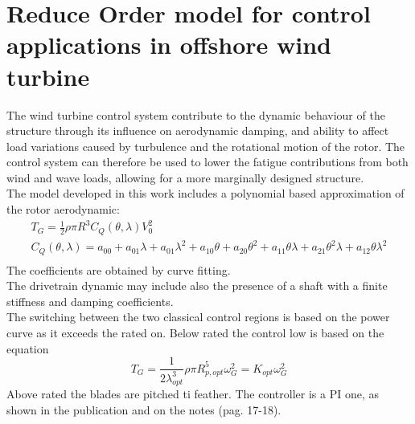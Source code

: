 \documentclass[]{article}
\begin{document}
\newpage
\section{Reduce Order model for control applications in offshore wind turbine  \cite{SMILDEN2016386}}
The wind turbine control system contribute to the dynamic behaviour of the structure through its influence on aerodynamic damping, and ability to affect load variations caused by turbulence and the rotational motion of the rotor. The control system can therefore be used to lower the fatigue contributions from both wind and wave loads, allowing for a more marginally designed structure. \\ 
The model developed in this work includes a polynomial based approximation of the rotor aerodynamic:
\begin{gather}
	T_G = \frac{1}{2}\rho\pi R^3 C_Q(\theta, \lambda) V_0^2\\
	C_Q(\theta, \lambda) = a_{00} + a_{01}\lambda +a_{01}\lambda^2 + a_{10}\theta + a_{20}\theta^2 + a_{11}\theta\lambda + a_{21}\theta^2\lambda + a_{12}\theta\lambda^2 \\
\end{gather} 
The coefficients are obtained by curve fitting.\\ 
The drivetrain dynamic may include also the presence of a shaft with a finite stiffness and damping coefficients.\\ 
The switching between the two classical control regions is based on the power curve as it exceeds the rated on. Below rated the control low is based on the equation 
\begin{equation}
	T_G = \frac{1}{2 \lambda_{opt}^3}\rho \pi R^5 _{p,opt}\omega_G^2 = K_{opt}\omega_G^2
\end{equation}
Above rated the blades are pitched ti feather. The controller is a PI one, as shown in the publication and on the notes (pag. 17-18).
\newpage
\end{document}
